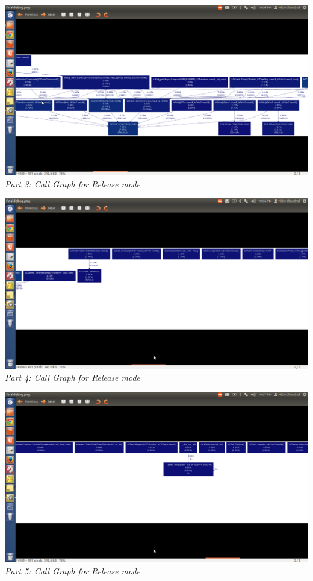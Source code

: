 \documentclass[11pt]{article}
\begin{document}
\begin{center}
 \includegraphics[scale = 0.35]{images/f3} \\
  \emph{Part 3: Call Graph for Release mode} \\
\end{center}

\begin{center}
 \includegraphics[scale = 0.35]{images/f4} \\
  \emph{Part 4: Call Graph for Release mode} \\
\end{center}

\begin{center}
 \includegraphics[scale = 0.35]{images/f5} \\
  \emph{Part 5: Call Graph for Release mode} \\
\end{center}
\end{document}
